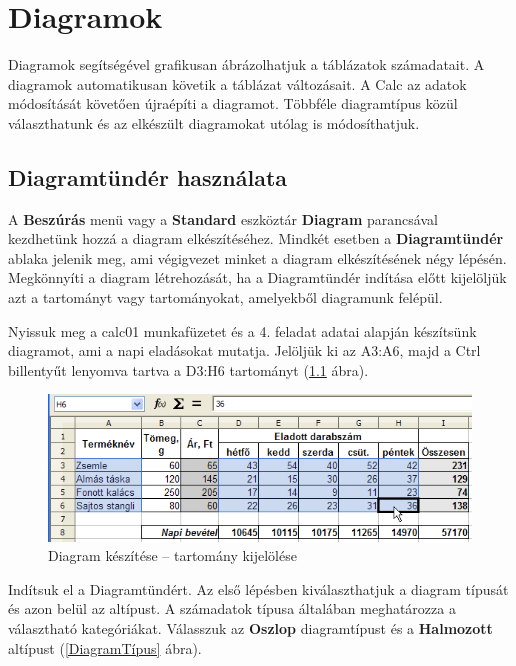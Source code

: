 \chapter{Diagramok}
\thispagestyle{empty}

Diagramok segítségével grafikusan ábrázolhatjuk a
táblázatok számadatait. A diagramok automatikusan követik a
táblázat változásait. A Calc az adatok módosítását
követően újraépíti a diagramot. Többféle diagramtípus
közül választhatunk és az elkészült diagramokat utólag is
módosíthatjuk.


\section{Diagramtündér használata}

A \textbf{Beszúrás} menü vagy a \textbf{Standard} eszköztár
\textbf{Diagram} parancsával kezdhetünk hozzá a diagram
elkészítéséhez. Mindkét esetben a \textbf{Diagramtündér}
ablaka jelenik meg, ami végigvezet minket a diagram
elkészítésének négy lépésén. Megkönnyíti a diagram
létrehozását, ha a Diagramtündér indítása előtt
kijelöljük azt a tartományt vagy tartományokat, amelyekből
diagramunk felépül.

Nyissuk meg a calc01 munkafüzetet és a 4. feladat adatai alapján
készítsünk diagramot, ami a napi eladásokat mutatja.
Jelöljük ki az A3:A6, majd a Ctrl billentyűt lenyomva tartva a
D3:H6 tartományt (\ref{DiagramTartomány} ábra).

\begin{figure}[!h]
\begin{center}
\includegraphics[width=15.159cm]{oocalcv2-img52.png}
\caption{Diagram készítése -- tartomány kijelölése}\label{DiagramTartomány}
\end{center}
\end{figure}

Indítsuk el a Diagramtündért. Az első lépésben
kiválaszthatjuk a diagram típusát és azon belül az
altípust. A számadatok típusa általában meghatározza a
választható kategóriákat. Válasszuk az \textbf{Oszlop}
diagramtípust és a \textbf{Halmozott} altípust (\ref{DiagramTípus} ábra).

